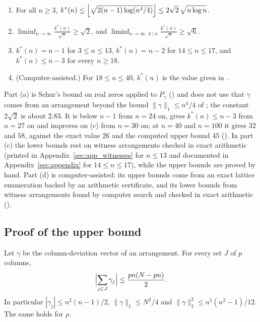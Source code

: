 \begin{theorem}
\label{thm:perm_threshold}
\leavevmode
\begin{enumerate}
\item[(a)] For all $n\ge3$, $\displaystyle k^{*}(n)\le\Bigl\lfloor\sqrt{2(n-1)\log(n^{4}/4)}\Bigr\rfloor\le 2\sqrt2\,\sqrt{n\log n}$.
\item[(b)] $\displaystyle\liminf_{n\to\infty}\frac{k^{*}(n)}{\sqrt n}\ge\sqrt2$, and $\displaystyle\liminf_{n\to\infty,\ 4\mid n}\frac{k^{*}(n)}{\sqrt n}\ge\sqrt6$.
\item[(c)] $k^{*}(n)=n-1$ for $3\le n\le13$, $k^{*}(n)=n-2$ for $14\le n\le17$, and $k^{*}(n)\le n-3$ for every $n\ge18$.
\item[(d)] \textup{(Computer-assisted.)} For $18\le n\le40$, $k^*(n)$ is the value given in .
\end{enumerate}
\end{theorem}

Part (a) is Schur's bound on real zeros applied to $P_\gamma$ () and does not use that $\gamma$ comes from an arrangement beyond the bound $\|\gamma\|_1\le n^4/4$ of ; the constant $2\sqrt2$ is about $2.83$.
It is below $n-1$ from $n=24$ on, gives $k^*(n)\le n-3$ from $n=27$ on and improves on (c) from $n=30$ on; at $n=40$ and $n=100$ it gives $32$ and $58$, against the exact value $26$ and the computed upper bound $45$ ().
In part (c) the lower bounds rest on witness arrangements checked in exact arithmetic (printed in Appendix~\ref{sec:app_witnesses} for $n\le13$ and documented in Appendix~\ref{sec:appendix} for $14\le n\le17$), while the upper bounds are proved by hand.
Part (d) is computer-assisted: its upper bounds come from an exact lattice enumeration backed by an arithmetic certificate, and its lower bounds from witness arrangements found by computer search and checked in exact arithmetic ().

\subsection{Proof of the upper bound}
\label{sec:kstar_upper}

\begin{lemma}
\label{lem:col_feasible}
Let $\gamma$ be the column-deviation vector of an arrangement.  For every set $J$ of $p$ columns,
\begin{equation}
\Bigl|\sum_{j\in J}\gamma_j\Bigr|\le \frac{pn(N-pn)}{2}.
\label{eq:col_feasible}
\end{equation}
In particular $|\gamma_j|\le n^{2}(n-1)/2$, $\|\gamma\|_1\le N^{2}/4$ and $\|\gamma\|_2^2\le n^5(n^2-1)/12$.  The same holds for $\rho$.
\end{lemma}


